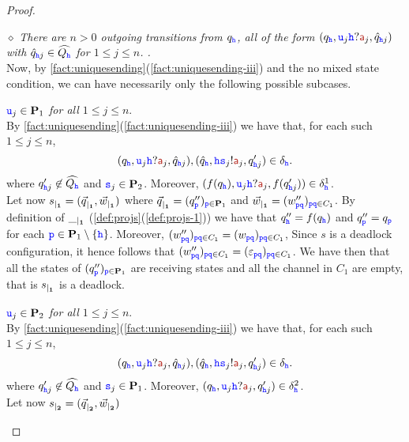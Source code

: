 \begin{proof}
\begin{description}
\item
\underline{$\diamond$}
{\em  There are $n>0$ outgoing transitions from $q_\hh$, all of the form
$(q_{\HH},\ttu_j\HH?\msg[a]_j,\hat q_{\hh j})$ with $\hat q_{\hh j} \in\widehat{Q_\hh}$
for $1\leq j\leq n$.
.}\\
Now, by \cref{fact:uniquesending}(\ref{fact:uniquesending-iii}) and the no mixed state condition,
we can have necessarily only the following possible subcases.
\begin{description} 
%
\item 
{\em $\ttu_j \in \roles_1$ for all $1\leq j\leq n$}.\\
By \cref{fact:uniquesending}(\ref{fact:uniquesending-iii}) we have that, for each such $1\leq j\leq n$,  
$$(q_{\HH},\ttu_j{\HH}?\msg[a]_j,\hat{q}_{\hh j}),(\hat{q}_\hh,\HH{\tts_j}!\msg[a]_j,q'_{\HH j})\in \delta_{\HH}.$$
where $q'_{\HH j}\not\in\widehat{Q_\hh}$ and $\tts_j\in\roles_2$. 
Moreover, $(f(q_\HH),\ttu_j\HH?\msg[a]_j,f(q'_{\HH j}))\in\delta^1_\HH$.\\
Let now $\restrict{s}{1}=(\restrict{\vec{q}}{1},\restrict{\vec{w}}{1})$
where $\restrict{\vec{q}}{1} = (q''_\ttp)_{\ttp\in\roles_1}$
and $\restrict{\vec{w}}{1} = (w''_{\ttp\ttq})_{\ttp\ttq\in C_1}$.
By definition of $\restrict{\_}{1}$ (\cref{def:projs}(\ref{def:projs-1}))
we have that $q''_\hh = f(q_\hh)$ and $q''_\ttp = q_\ttp$ for each $\ttp\in\roles_1\setminus\Set{\hh}$.
Moreover, $(w''_{\ttp\ttq})_{\ttp\ttq\in C_1} =  (w_{\ttp\ttq})_{\ttp\ttq\in C_1}$,
Since $s$ is a deadlock configuration, it hence follows that  $(w''_{\ttp\ttq})_{\ttp\ttq\in C_1} =  (\varepsilon_{\ttp\ttq})_{\ttp\ttq\in C_1}$.
We have then that all the states of $(q''_\ttp)_{\ttp\in\roles_1}$ are receiving states
and all the channel in $C_1$ are empty, that is $\restrict{s}{1}$ is a deadlock.
%
\item 
{\em $\ttu_j \in \roles_2$ for all $1\leq j\leq n$}.\\
By \cref{fact:uniquesending}(\ref{fact:uniquesending-iii}) we have that, for each such $1\leq j\leq n$,  
$$(q_{\HH},\ttu_j{\HH}?\msg[a]_j,\hat{q}_{\hh j}),(\hat{q}_\hh,\HH{\tts_j}!\msg[a]_j,q'_{\HH j})\in \delta_{\HH}.$$
where $q'_{\HH j}\not\in\widehat{Q_\hh}$ and $\tts_j\in\roles_1$. 
Moreover, $(q_\HH,\ttu_j\HH?\msg[a]_j,q'_{\HH j})\in\delta^2_\HH$.\\
Let now $\restrict{s}{2}=(\restrict{\vec{q}}{2},\restrict{\vec{w}}{2})$

\end{description}
\end{description}
\end{proof}
